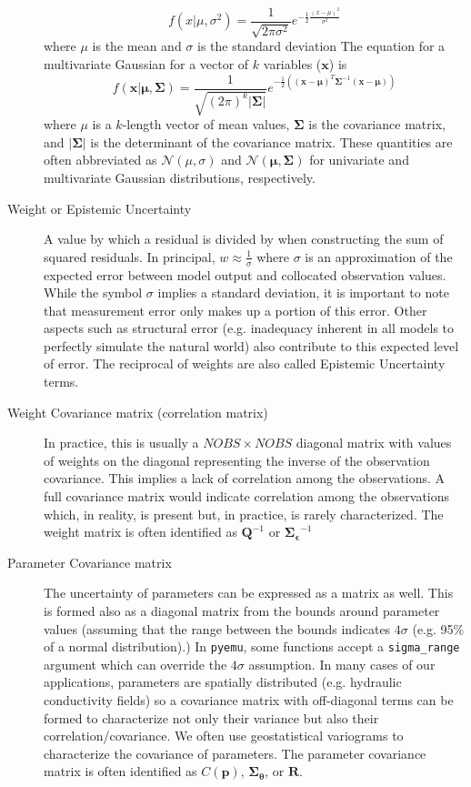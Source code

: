 \documentclass[english]{article}
\begin{document}
\begin{description}
\begin{equation}
f(x|\mu,\sigma^2)=\frac{1}{\sqrt{2\pi\sigma^2}}e^{-\frac{1}{2}\frac{\left(x-\mu\right)^2}{\sigma^2}}
\end{equation}
where $\mu$ is the mean and $\sigma$ is the standard deviation
The equation for a multivariate Gaussian for a vector of $k$ variables ($\mathbf{x}$) is
\begin{equation}
f(\mathbf{x} | \mathbf{\mu},\mathbf{\Sigma})=\frac{1}{\sqrt{(2\pi)^k\left|\mathbf{\Sigma}\right|}}e^{-\frac{1}{2}\left( \left(\mathbf{x}-\mathbf{\mu} \right)^T  \mathbf{\Sigma}^{-1}\left(\mathbf{x}-\mathbf{\mu} \right)\right)}
\end{equation}
where $\mu$ is a $k$-length vector of mean values, $\mathbf{\Sigma}$ is the covariance matrix, and $\left|\mathbf{\Sigma}\right|$ is the determinant of the covariance matrix.  
These quantities are often abbreviated as $\mathcal{N}\left( \mu, \sigma \right)$ and $\mathcal{N}\left(\boldsymbol{\mu}, \boldsymbol{\Sigma} \right)$ for univariate and multivariate Gaussian distributions, respectively.
\item [Weight or Epistemic Uncertainty] A value by which a residual is divided by when constructing the sum of squared residuals. In principal, $w\approx\frac{1}{\sigma}$ where $\sigma$ is an approximation of the expected error between model output and collocated observation values. While the symbol $\sigma$ implies a standard deviation, it is important to note that measurement error only makes up a portion of this error. Other aspects such as structural error (e.g. inadequacy inherent in all models to perfectly simulate the natural world) also contribute to this expected level of error. The reciprocal of weights are also called Epistemic Uncertainty terms.
\item [Weight Covariance matrix (correlation matrix)] In practice, this is usually a $NOBS\times NOBS$ diagonal matrix with values of weights on the diagonal representing the inverse of the observation covariance. This implies a lack of correlation among the observations. A full covariance matrix would indicate correlation among the observations which, in reality, is present but, in practice, is rarely characterized. The weight matrix is often identified as $\mathbf{Q}^{-1}$ or $\mathbf{\Sigma_\epsilon}^{-1}$
\item [Parameter Covariance matrix] The uncertainty of parameters can be expressed as a matrix as well. This is formed also as a diagonal matrix from the bounds around parameter values (assuming that the range between the bounds indicates $4\sigma$ (e.g. 95\% of a normal distribution).) In \texttt{pyemu}, some functions accept a \texttt{sigma\_range} argument which can override the $4\sigma$ assumption. In many cases of our applications, parameters are spatially distributed (e.g. hydraulic conductivity fields) so a covariance matrix with off-diagonal terms can be formed to characterize not only their variance but also their correlation/covariance. We often use geostatistical variograms to characterize the covariance of parameters. The parameter covariance matrix is often identified as $C(\mathbf{p})$, $\mathbf{\Sigma_\theta}$, or $\mathbf{R}$.

\end{description}
\end{document}
